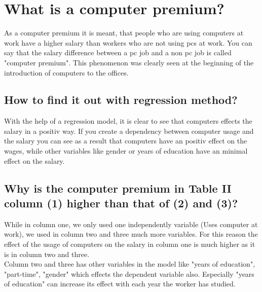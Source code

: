 
\chapter{What is a computer premium?}
As a computer premium it is meant, that people who are using computers at work have a higher salary than workers who are not using pcs at work. You can say that the salary difference between a pc job and a non pc job is called "computer premium". This phenomenon was clearly seen at the beginning of the introduction of computers to the offices. 

\section{How to find it out with regression method?}
With the help of a regression model, it is clear to see that computers effects the salary in a positiv way. If you create a dependency between computer usage and the salary you can see as a result that computers have an positiv effect on the wages, while other variables like gender or years of education have an minimal effect on the salary.\\


\section{Why is the
computer premium in Table II column (1) higher than that of (2) and (3)?}
While in column one, we only used one independently variable (Uses computer at work), we used in column two and three much more variables. For this reason the effect of the usage of computers on the salary in column one is much higher as it is in column two and three. \\
Column two and three has other variables in the model like "years of education", "part-time", "gender" which effects the dependent variable also. Especially "years of education" can increase its effect with each year the worker has studied.
